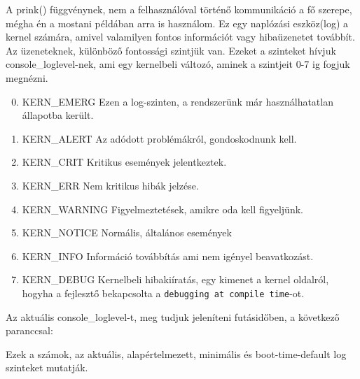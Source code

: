 A prink() függvénynek, nem a felhasználóval történő kommunikáció a fő szerepe, mégha én a mostani példában arra is használom. Ez egy naplózási eszköz(log) a kernel számára, amivel valamilyen fontos információt vagy hibaüzenetet továbbít. Az üzeneteknek, különböző fontossági szintjük van. Ezeket a szinteket hívjuk console\_loglevel-nek, ami egy kernelbeli változó, aminek a szintjeit 0-7 ig fogjuk megnézni. 
\begin{enumerate}
\setcounter{enumi}{-1}
	\item KERN\_EMERG \- Ezen a log-szinten, a rendszerünk már használhatatlan állapotba került.
	\item KERN\_ALERT \- Az adódott problémákról, gondoskodnunk kell.
	\item KERN\_CRIT \- Kritikus események jelentkeztek.
	\item KERN\_ERR \- Nem kritikus hibák jelzése.
	\item KERN\_WARNING	\- Figyelmeztetések, amikre oda kell figyeljünk.
	\item KERN\_NOTICE \- Normális, általános események
	\item KERN\_INFO \- Információ továbbítás ami nem igényel beavatkozást.
	\item KERN\_DEBUG \- Kernelbeli hibakiíratás, egy kimenet a kernel oldalról, hogyha a fejlesztő bekapcsolta a \texttt{debugging at compile time}-ot.
\end{enumerate}
Az aktuális console\_loglevel-t, meg tudjuk jeleníteni futásidőben, a következő paranccsal:
Ezek a számok, az aktuális, alapértelmezett, minimális és boot-time-default log szinteket mutatják.

